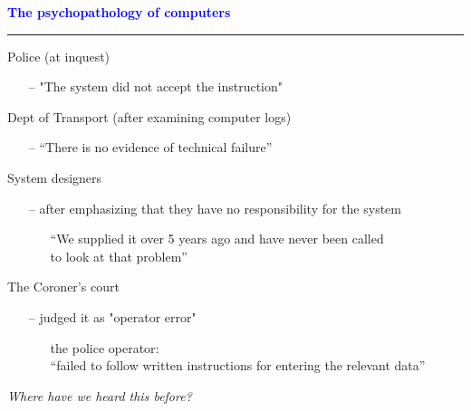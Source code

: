 \documentclass[pdf]{beamer}
\begin{document}
\begin{frame}
    \textcolor{Blue}{\textbf{\Large{The psychopathology of computers}}}
    \textcolor{red}{\rule{10cm}{1mm}}

{\normalsize Police (at inquest) }

\begin{itemize}
  \item[\textcolor{black}{--}] {\footnotesize "The system did not accept the instruction"}
\end{itemize}

\smallskip
{\normalsize Dept of Transport (after examining computer logs)}
\begin{itemize}
  \item[\textcolor{black}{--}] {\footnotesize “There is no evidence of technical failure”}
\end{itemize}

\smallskip
{\normalsize System designers}
\begin{itemize}
  \item[\textcolor{black}{--}] {\footnotesize after emphasizing that they have no responsibility for the system}
  \begin{itemize}
      \item[\textcolor{black}{\textbullet}]  {\scriptsize “We supplied it over 5 years ago and have never been called \\ to look at that problem”}
  \end{itemize}
\end{itemize}

\smallskip
{\normalsize The Coroner’s court}
\begin{itemize}
  \item[\textcolor{black}{--}] {\footnotesize judged it as "operator error"}
  \begin{itemize}
      \item[\textcolor{black}{\textbullet}]  {\scriptsize the police operator:\\
    “failed to follow written instructions for entering the relevant data”
}
  \end{itemize}
\end{itemize}

\bigskip
{\LARGE \textit{Where have we heard this before?}}


\end{frame}
\end{document}
